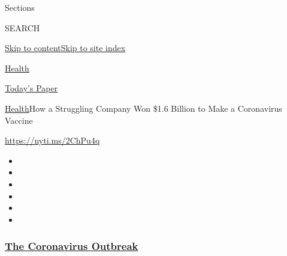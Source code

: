 Sections

SEARCH

\protect\hyperlink{site-content}{Skip to
content}\protect\hyperlink{site-index}{Skip to site index}

\href{https://www.nytimes3xbfgragh.onion/section/health}{Health}

\href{https://myaccount.nytimes3xbfgragh.onion/auth/login?response_type=cookie\&client_id=vi}{}

\href{https://www.nytimes3xbfgragh.onion/section/todayspaper}{Today's
Paper}

\href{/section/health}{Health}\textbar{}How a Struggling Company Won
\$1.6 Billion to Make a Coronavirus Vaccine

\url{https://nyti.ms/2ChPu4q}

\begin{itemize}
\item
\item
\item
\item
\item
\item
\end{itemize}

\hypertarget{the-coronavirus-outbreak}{%
\subsubsection{\texorpdfstring{\href{https://www.nytimes3xbfgragh.onion/news-event/coronavirus?name=styln-coronavirus-national\&region=TOP_BANNER\&variant=undefined\&block=storyline_menu_recirc\&action=click\&pgtype=Article\&impression_id=d84f7cc0-e39d-11ea-a4ee-ebb6d55f184c}{The
Coronavirus
Outbreak}}{The Coronavirus Outbreak}}\label{the-coronavirus-outbreak}}

